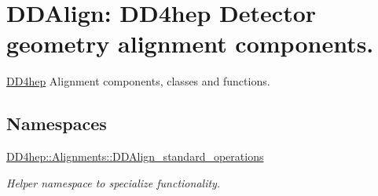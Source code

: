 \hypertarget{group___d_d4_h_e_p___a_l_i_g_n}{}\section{D\+D\+Align\+: D\+D4hep Detector geometry alignment components.}
\label{group___d_d4_h_e_p___a_l_i_g_n}


\hyperlink{namespace_d_d4hep}{D\+D4hep} Alignment components, classes and functions.  


\subsection*{Namespaces}
\begin{DoxyCompactItemize}
\item 
 \hyperlink{namespace_d_d4hep_1_1_alignments_1_1_d_d_align__standard__operations}{D\+D4hep\+::\+Alignments\+::\+D\+D\+Align\+\_\+standard\+\_\+operations}
\begin{DoxyCompactList}\small\item\em Helper namespace to specialize functionality. \end{DoxyCompactList}\end{DoxyCompactItemize}
